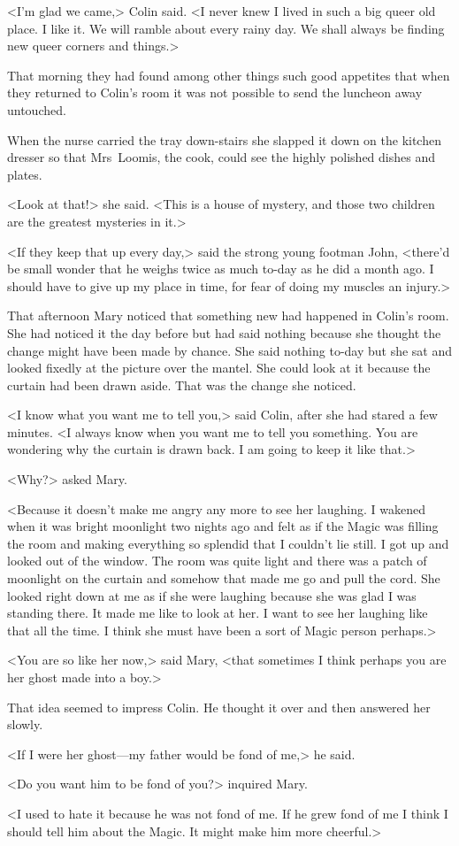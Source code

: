 <I'm glad we came,> Colin said. <I never knew I lived in such a big queer old place. I like it. We will ramble about every rainy day. We shall always be finding new queer corners and things.>

That morning they had found among other things such good appetites that when they returned to Colin's room it was not possible to send the luncheon away untouched.

When the nurse carried the tray down-stairs she slapped it down on the kitchen dresser so that Mrs~Loomis, the cook, could see the highly polished dishes and plates.

<Look at that!> she said. <This is a house of mystery, and those two children are the greatest mysteries in it.>

<If they keep that up every day,> said the strong young footman John, <there'd be small wonder that he weighs twice as much to-day as he did a month ago. I should have to give up my place in time, for fear of doing my muscles an injury.>

That afternoon Mary noticed that something new had happened in Colin's room. She had noticed it the day before but had said nothing because she thought the change might have been made by chance. She said nothing to-day but she sat and looked fixedly at the picture over the mantel. She could look at it because the curtain had been drawn aside. That was the change she noticed.

<I know what you want me to tell you,> said Colin, after she had stared a few minutes. <I always know when you want me to tell you something. You are wondering why the curtain is drawn back. I am going to keep it like that.>

<Why?> asked Mary.

<Because it doesn't make me angry any more to see her laughing. I wakened when it was bright moonlight two nights ago and felt as if the Magic was filling the room and making everything so splendid that I couldn't lie still. I got up and looked out of the window. The room was quite light and there was a patch of moonlight on the curtain and somehow that made me go and pull the cord. She looked right down at me as if she were laughing because she was glad I was standing there. It made me like to look at her. I want to see her laughing like that all the time. I think she must have been a sort of Magic person perhaps.>

<You are so like her now,> said Mary, <that sometimes I think perhaps you are her ghost made into a boy.>

That idea seemed to impress Colin. He thought it over and then answered her slowly.

<If I were her ghost—my father would be fond of me,> he said.

<Do you want him to be fond of you?> inquired Mary.

<I used to hate it because he was not fond of me. If he grew fond of me I think I should tell him about the Magic. It might make him more cheerful.>